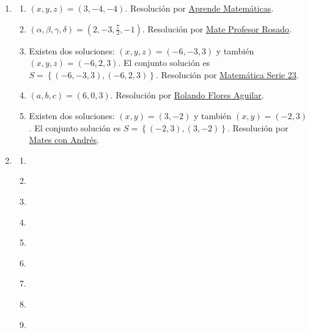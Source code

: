 \documentclass[a4paper]{article}
\newcommand{\exercise}{\item}
\begin{document}
\begin{enumerate}
\begin{enumerate} [label=(\alph*)]
		\item $C.D=\left(\begin{matrix} -2 \end{matrix}\right)$
		\item $D.C=\left(\begin{matrix} -2 & 0 & -4 \\ -1 & 0 & -2 \\ 0 & 0 & 0 \end{matrix}\right)$
		\item $E.D-D=\left(\begin{matrix} 0 \\ 0 \\ 0 \end{matrix}\right)$
		\item $C.E+C=\left(\begin{matrix} 2 & 0 & 3 \end{matrix}\right)$
\end{enumerate}\exercise\begin{enumerate} [label=(\alph*)]		\item $(x,y,z)=(3,-4,-4)$. Resolución por \href{https://youtu.be/hIkRaA2IfQ8?t=328}{Aprende Matemáticas}.
		\item $\left(\alpha,\beta,\gamma,\delta\right)=(2,-3,\frac{7}{2},-1)$. Resolución por \href{https://youtu.be/ENijHEsXKoc}{Mate Profesor Rosado}.
		\item Existen dos soluciones: $(x,y,z)=(-6,-3,3)$ y también $(x,y,z)=(-6,2,3)$. El conjunto solución es $S=\left\{(-6,-3,3),(-6,2,3)\right\}$. Resolución por \href{https://youtu.be/3WSRu7shF4s}{Matemática Serie 23}.
		\item $(a,b,c)=(6,0,3)$. Resolución por \href{https://youtu.be/L1cAscCfFmU}{Rolando Flores Aguilar}.
		\item Existen dos soluciones: $(x,y)=(3,-2)$ y también $(x,y)=(-2,3)$. El conjunto solución es $S=\left\{(-2,3),(3,-2)\right\}$. Resolución por \href{https://youtu.be/wj-r4isFDN4}{Mates con Andrés}.
\end{enumerate}\exercise\begin{enumerate} [label=(\alph*)]		\item ~
		\item ~
		\item ~
		\item ~
		\item ~
		\item ~
		\item ~
		\item ~
		\item ~

\end{enumerate}
\end{enumerate}
\end{document}
